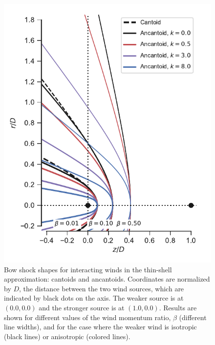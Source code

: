 \begin{figure}
\includegraphics[width=\linewidth]{figs/ancantoid-shape}
\caption{Bow shock shapes for interacting winds in the thin-shell
  approximation: cantoids and ancantoids. Coordinates are normalized
  by $D$, the distance between the two wind sources, which are
  indicated by black dots on the axis.  The weaker source is at
  \((0.0, 0.0)\) and the stronger source is at \((1.0, 0.0)\).
  Results are shown for different values of the wind momentum ratio,
  \(\beta\) (different line widths), and for the case where the weaker
  wind is isotropic (black lines) or anisotropic (colored lines).}
\label{fig:r-beta}
\end{figure}


